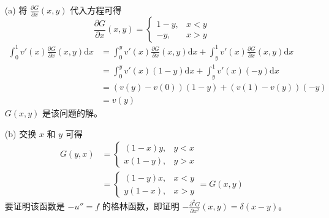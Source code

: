 \documentclass[a4paper]{article}
\begin{document}
\begin{enumerate}
    \item[(a)] 将 $\frac{\partial G}{\partial x}(x,y)$ 代入方程可得
            \begin{equation}
                \frac{\partial G}{\partial x}(x,y)=\begin{cases}
                    1-y, & x<y \\
                    -y, & x>y
                \end{cases}
            \end{equation}
            \begin{equation}
                \begin{aligned}
                    \int_{0}^{1}v'(x)\frac{\partial G}{\partial x}(x,y)\text{d}x
                    &= \int_{0}^{y}v'(x)\frac{\partial G}{\partial x}(x,y)\text{d}x
                    + \int_{y}^{1}v'(x)\frac{\partial G}{\partial x}(x,y)\text{d}x\\
                    &= \int_{0}^{y}v'(x)(1-y)\text{d}x
                    + \int_{y}^{1}v'(x)(-y)\text{d}x\\
                    &= \left(v(y)-v(0)\right)(1-y)
                    + \left(v(1)-v(y)\right)(-y)\\
                    &=v(y)
                \end{aligned}
            \end{equation}
            $G(x,y)$ 是该问题的解。
    \item[(b)] 交换 $x$ 和 $y$ 可得
            \begin{equation}
                \begin{aligned}
                    G(y,x)&=\begin{cases}
                        (1-x)y, & y<x \\
                        x(1-y), & y>x
                    \end{cases}\\
                    &=\begin{cases}
                        (1-y)x, & x<y \\
                        y(1-x), & x>y
                    \end{cases}=G(x,y)
                \end{aligned}
            \end{equation}
            要证明该函数是 $-u''=f$ 的格林函数，即证明 $-\frac{\partial^2 G}{\partial x^2}(x,y)=\delta(x-y)$。
            \begin{equation}

\end{equation}
\end{enumerate}
\end{document}
